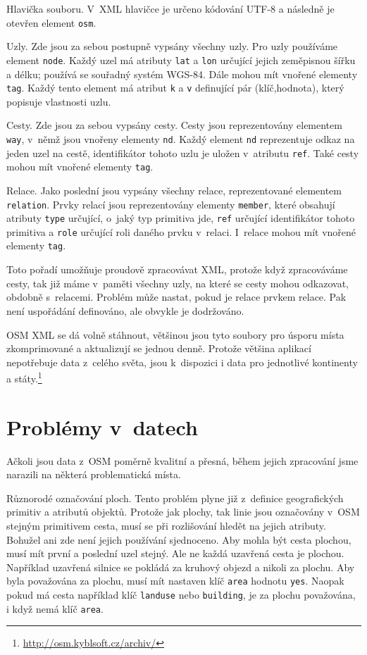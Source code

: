 {\tuc Hlavička souboru.} V~XML hlavičce je určeno kódování UTF-8 a následně je
otevřen element \verb|osm|. 

{\tuc Uzly.} Zde jsou za sebou postupně vypsány všechny uzly.  Pro uzly
používáme element \verb|node|. Každý uzel má atributy \verb|lat| a \verb|lon|
určující jejich zeměpisnou šířku a délku; používá se souřadný systém
WGS-84. \cite{wgsnorma} Dále mohou mít vnořené elementy \verb|tag|. Každý tento
element má atribut \verb|k| a \verb|v| definující pár (klíč,hodnota), který
popisuje vlastnosti uzlu.

{\tuc Cesty.} Zde jsou za sebou vypsány cesty. Cesty jsou reprezentovány
elementem \verb|way|, v~němž jsou vnořeny elementy \verb|nd|. Každý element
\verb|nd| reprezentuje odkaz na jeden uzel na cestě, identifikátor tohoto uzlu
je uložen v~atributu \verb|ref|. Také cesty mohou mít vnořené elementy
\verb|tag|.

{\tuc Relace.} Jako poslední jsou vypsány všechny relace, reprezentované
elementem \verb|relation|. Prvky relací jsou reprezentovány elementy
\verb|member|, které obsahují atributy \verb|type| určující, o~jaký typ
primitiva jde, \verb|ref| určující identifikátor tohoto primitiva a \verb|role|
určující roli daného prvku v~relaci. I~relace mohou mít vnořené elementy
\verb|tag|.

Toto pořadí umožňuje proudově zpracovávat XML, protože když zpracováváme cesty,
tak již máme v~paměti všechny uzly, na které se cesty mohou odkazovat, obdobně
s~relacemi. Problém může nastat, pokud je relace prvkem relace. Pak není
uspořádání definováno, ale obvykle je dodržováno. 

OSM XML se dá volně stáhnout, většinou jsou tyto soubory pro úsporu místa
zkomprimované a aktualizují se jednou denně. Protože většina aplikací
nepotřebuje data z~celého světa, jsou k~dispozici i data pro jednotlivé
kontinenty a státy.\footnote{\url{http://osm.kyblsoft.cz/archiv/}}

\section{Problémy v~datech}
Ačkoli jsou data z~OSM poměrně kvalitní a přesná, během jejich zpracování jsme
narazili na některá problematická místa. 

{\tuc Různorodé označování ploch.} Tento problém plyne již z~definice geografických
primitiv a atributů objektů. Protože jak plochy, tak linie jsou označovány v~OSM
stejným primitivem cesta, musí se při rozlišování hledět na jejich atributy.
Bohužel ani zde není jejich používání sjednoceno. Aby mohla být cesta
plochou, musí mít první a poslední uzel stejný. Ale ne každá uzavřená 
cesta je plochou. Například uzavřená silnice se pokládá za kruhový objezd a
nikoli za plochu. Aby byla považována za plochu, musí mít nastaven klíč
\verb|area| hodnotu \verb|yes|. Naopak pokud má cesta například klíč \verb|landuse|
nebo \verb|building|, je za plochu považována, i když nemá klíč \verb|area|.

